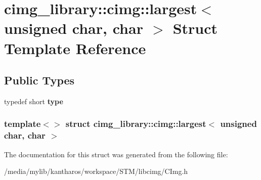 \hypertarget{structcimg__library_1_1cimg_1_1largest_3_01unsigned_01char_00_01char_01_4}{
\section{cimg\_\-library::cimg::largest$<$ unsigned char, char $>$ Struct Template Reference}
\label{structcimg__library_1_1cimg_1_1largest_3_01unsigned_01char_00_01char_01_4}
}
\subsection*{Public Types}
\begin{DoxyCompactItemize}
\item 
\hypertarget{structcimg__library_1_1cimg_1_1largest_3_01unsigned_01char_00_01char_01_4_ad82109cc2f8fb6a0a5c8b627c77023e7}{
typedef short {\bfseries type}}
\label{structcimg__library_1_1cimg_1_1largest_3_01unsigned_01char_00_01char_01_4_ad82109cc2f8fb6a0a5c8b627c77023e7}

\end{DoxyCompactItemize}
\subsubsection*{template$<$$>$ struct cimg\_\-library::cimg::largest$<$ unsigned char, char $>$}



The documentation for this struct was generated from the following file:\begin{DoxyCompactItemize}
\item 
/media/mylib/kantharos/workspace/STM/libcimg/CImg.h\end{DoxyCompactItemize}
